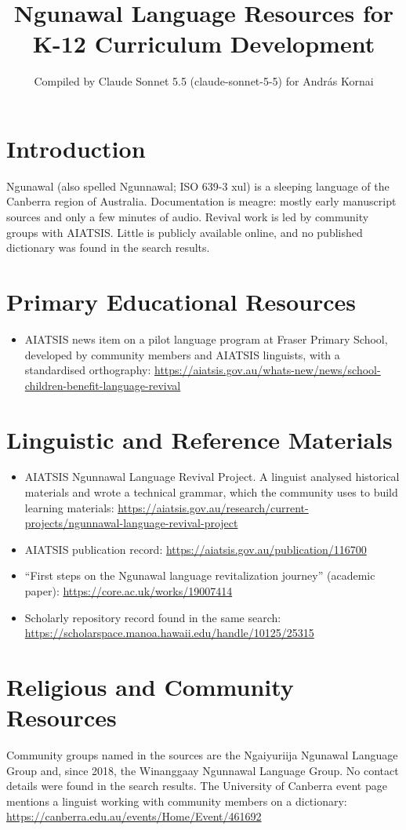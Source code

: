 \documentclass[12pt]{article}
\title{Ngunawal Language Resources for K-12 Curriculum Development}
\author{Compiled by Claude Sonnet 5.5 (claude-sonnet-5-5) for Andr\'as Kornai}
\date{}
\begin{document}
\maketitle
\section{Introduction}
Ngunawal (also spelled Ngunnawal; ISO 639-3 xul) is a sleeping language of the Canberra region of Australia. Documentation is meagre: mostly early manuscript sources and only a few minutes of audio. Revival work is led by community groups with AIATSIS. Little is publicly available online, and no published dictionary was found in the search results.
\section{Primary Educational Resources}
\begin{itemize}
\item AIATSIS news item on a pilot language program at Fraser Primary School, developed by community members and AIATSIS linguists, with a standardised orthography: \url{https://aiatsis.gov.au/whats-new/news/school-children-benefit-language-revival}
\end{itemize}
\section{Linguistic and Reference Materials}
\begin{itemize}
\item AIATSIS Ngunnawal Language Revival Project. A linguist analysed historical materials and wrote a technical grammar, which the community uses to build learning materials: \url{https://aiatsis.gov.au/research/current-projects/ngunnawal-language-revival-project}
\item AIATSIS publication record: \url{https://aiatsis.gov.au/publication/116700}
\item ``First steps on the Ngunawal language revitalization journey'' (academic paper): \url{https://core.ac.uk/works/19007414}
\item Scholarly repository record found in the same search: \url{https://scholarspace.manoa.hawaii.edu/handle/10125/25315}
\end{itemize}
\section{Religious and Community Resources}
Community groups named in the sources are the Ngaiyuriija Ngunawal Language Group and, since 2018, the Winanggaay Ngunnawal Language Group. No contact details were found in the search results. The University of Canberra event page mentions a linguist working with community members on a dictionary: \url{https://canberra.edu.au/events/Home/Event/461692}
\end{document}
